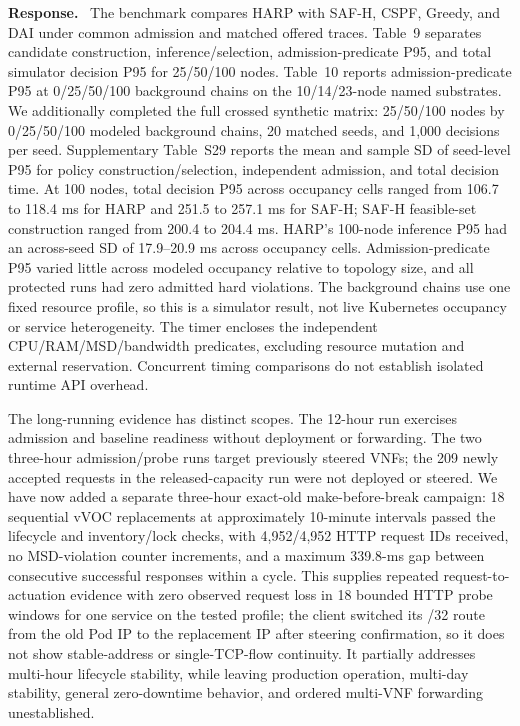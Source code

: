 \documentclass[11pt]{article}
\newenvironment{reply}{%
  \color{replyblue}%
  \noindent\textbf{Response.}\ 
}{%
  \par\medskip
}
\begin{document}
\begin{reply}
The benchmark compares HARP with SAF-H, CSPF, Greedy, and DAI under common admission and matched offered traces. Table~9 separates candidate construction, inference/selection, admission-predicate P95, and total simulator decision P95 for 25/50/100 nodes. Table~10 reports admission-predicate P95 at 0/25/50/100 background chains on the 10/14/23-node named substrates. We additionally completed the full crossed synthetic matrix: 25/50/100 nodes by 0/25/50/100 modeled background chains, 20 matched seeds, and 1,000 decisions per seed. Supplementary Table~S29 reports the mean and sample SD of seed-level P95 for policy construction/selection, independent admission, and total decision time. At 100 nodes, total decision P95 across occupancy cells ranged from 106.7 to 118.4 ms for HARP and 251.5 to 257.1 ms for SAF-H; SAF-H feasible-set construction ranged from 200.4 to 204.4 ms. HARP's 100-node inference P95 had an across-seed SD of 17.9--20.9 ms across occupancy cells. Admission-predicate P95 varied little across modeled occupancy relative to topology size, and all protected runs had zero admitted hard violations. The background chains use one fixed resource profile, so this is a simulator result, not live Kubernetes occupancy or service heterogeneity. The timer encloses the independent CPU/RAM/MSD/bandwidth predicates, excluding resource mutation and external reservation. Concurrent timing comparisons do not establish isolated runtime API overhead.

The long-running evidence has distinct scopes. The 12-hour run exercises admission and baseline readiness without deployment or forwarding. The two three-hour admission/probe runs target previously steered VNFs; the 209 newly accepted requests in the released-capacity run were not deployed or steered. We have now added a separate three-hour exact-old make-before-break campaign: 18 sequential vVOC replacements at approximately 10-minute intervals passed the lifecycle and inventory/lock checks, with 4,952/4,952 HTTP request IDs received, no MSD-violation counter increments, and a maximum 339.8-ms gap between consecutive successful responses within a cycle. This supplies repeated request-to-actuation evidence with zero observed request loss in 18 bounded HTTP probe windows for one service on the tested profile; the client switched its /32 route from the old Pod IP to the replacement IP after steering confirmation, so it does not show stable-address or single-TCP-flow continuity. It partially addresses multi-hour lifecycle stability, while leaving production operation, multi-day stability, general zero-downtime behavior, and ordered multi-VNF forwarding unestablished.


\end{reply}
\end{document}
